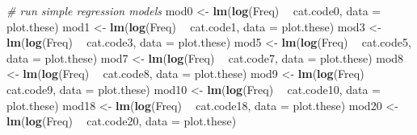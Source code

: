 \documentclass[]{article}
\newenvironment{Shaded}{\begin{snugshade}}{\end{snugshade}}
\newcommand{\KeywordTok}[1]{\textcolor[rgb]{0.13,0.29,0.53}{\textbf{#1}}}
\newcommand{\DataTypeTok}[1]{\textcolor[rgb]{0.13,0.29,0.53}{#1}}
\newcommand{\StringTok}[1]{\textcolor[rgb]{0.31,0.60,0.02}{#1}}
\newcommand{\CommentTok}[1]{\textcolor[rgb]{0.56,0.35,0.01}{\textit{#1}}}
\newcommand{\OperatorTok}[1]{\textcolor[rgb]{0.81,0.36,0.00}{\textbf{#1}}}
\newcommand{\NormalTok}[1]{#1}
\begin{document}
\begin{Shaded}
\begin{Highlighting}[]
  \CommentTok{# run simple regression models}
\NormalTok{  mod0 <-}\StringTok{ }\KeywordTok{lm}\NormalTok{(}\KeywordTok{log}\NormalTok{(Freq) }\OperatorTok{~}\StringTok{ }\NormalTok{cat.code0, }\DataTypeTok{data =}\NormalTok{ plot.these)}
\NormalTok{  mod1 <-}\StringTok{ }\KeywordTok{lm}\NormalTok{(}\KeywordTok{log}\NormalTok{(Freq) }\OperatorTok{~}\StringTok{ }\NormalTok{cat.code1, }\DataTypeTok{data =}\NormalTok{ plot.these)}
\NormalTok{  mod3 <-}\StringTok{ }\KeywordTok{lm}\NormalTok{(}\KeywordTok{log}\NormalTok{(Freq) }\OperatorTok{~}\StringTok{ }\NormalTok{cat.code3, }\DataTypeTok{data =}\NormalTok{ plot.these)}
\NormalTok{  mod5 <-}\StringTok{ }\KeywordTok{lm}\NormalTok{(}\KeywordTok{log}\NormalTok{(Freq) }\OperatorTok{~}\StringTok{ }\NormalTok{cat.code5, }\DataTypeTok{data =}\NormalTok{ plot.these)}
\NormalTok{  mod7 <-}\StringTok{ }\KeywordTok{lm}\NormalTok{(}\KeywordTok{log}\NormalTok{(Freq) }\OperatorTok{~}\StringTok{ }\NormalTok{cat.code7, }\DataTypeTok{data =}\NormalTok{ plot.these)}
\NormalTok{  mod8 <-}\StringTok{ }\KeywordTok{lm}\NormalTok{(}\KeywordTok{log}\NormalTok{(Freq) }\OperatorTok{~}\StringTok{ }\NormalTok{cat.code8, }\DataTypeTok{data =}\NormalTok{ plot.these)}
\NormalTok{  mod9 <-}\StringTok{ }\KeywordTok{lm}\NormalTok{(}\KeywordTok{log}\NormalTok{(Freq) }\OperatorTok{~}\StringTok{ }\NormalTok{cat.code9, }\DataTypeTok{data =}\NormalTok{ plot.these)}
\NormalTok{  mod10 <-}\StringTok{ }\KeywordTok{lm}\NormalTok{(}\KeywordTok{log}\NormalTok{(Freq) }\OperatorTok{~}\StringTok{ }\NormalTok{cat.code10, }\DataTypeTok{data =}\NormalTok{ plot.these)}
\NormalTok{  mod18 <-}\StringTok{ }\KeywordTok{lm}\NormalTok{(}\KeywordTok{log}\NormalTok{(Freq) }\OperatorTok{~}\StringTok{ }\NormalTok{cat.code18, }\DataTypeTok{data =}\NormalTok{ plot.these)}
\NormalTok{  mod20 <-}\StringTok{ }\KeywordTok{lm}\NormalTok{(}\KeywordTok{log}\NormalTok{(Freq) }\OperatorTok{~}\StringTok{ }\NormalTok{cat.code20, }\DataTypeTok{data =}\NormalTok{ plot.these)}
  

\end{Highlighting}
\end{Shaded}
\end{document}
